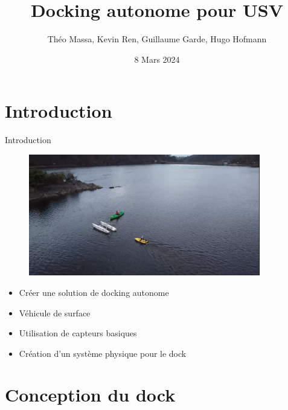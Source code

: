 \documentclass[pdftex,beamer,aspectratio=169]{beamer}
\title[Docking]{\vspace{-1cm}Docking autonome pour USV}
\author[]{Théo Massa, Kevin Ren, Guillaume Garde, Hugo Hofmann}
\date{8 Mars 2024}
\institute{ENSTA Bretagne-Lab STICC-Université Bretagne Sud}
\theoremstyle{definition}
\theoremstyle{example}
\theoremstyle{plain}
\begin{document}
\frame{\titlepage}

\begin{frame}[allowframebreaks]
  \tableofcontents
\end{frame}

\section{Introduction} 
\begin{frame}{Introduction}
  \begin{minipage}{0.6\textwidth}
    \begin{figure}
      \centering
      \includegraphics[width=0.9\textwidth]{img_lac.png}
    \end{figure}
  \end{minipage}\hfill
  \begin{minipage}{0.39\textwidth}
    \begin{itemize}
      \item Créer une solution de docking autonome
      \item Véhicule de surface
      \item Utilisation de capteurs basiques
      \item Création d'un système physique pour le dock
    \end{itemize}
  \end{minipage}
\end{frame}

\section{Conception du dock}
\end{document}
